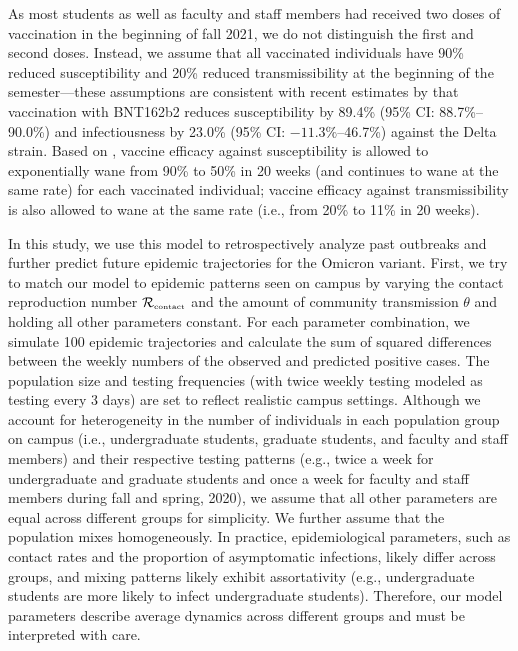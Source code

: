 \documentclass[12pt]{article}
\newcommand{\Rx}[1]{\ensuremath{{\mathcal R}_{#1}}}
\newcommand{\Rc}{\Rx{\textrm{\tiny{contact}}}}
\begin{document}
As most students as well as faculty and staff members had received two doses of vaccination in the beginning of fall 2021, we do not distinguish the first and second doses.
Instead, we assume that all vaccinated individuals have 90\% reduced susceptibility and 20\% reduced transmissibility at the beginning of the semester---these assumptions are consistent with recent estimates by \citep{prunas2022vaccination} that vaccination with BNT162b2 reduces susceptibility by 89.4\% (95\% CI: 88.7\%--90.0\%) and infectiousness by 23.0\% (95\% CI: $-11.3\%$--46.7\%) against the Delta strain.
Based on \citep{tartof2021effectiveness}, vaccine efficacy against susceptibility is allowed to exponentially wane from 90\% to 50\% in 20 weeks (and continues to wane at the same rate) for each vaccinated individual;
vaccine efficacy against transmissibility is also allowed to wane at the same rate (i.e., from 20\% to 11\% in 20 weeks).

In this study, we use this model to retrospectively analyze past outbreaks and further predict future epidemic trajectories for the Omicron variant.
First, we try to match our model to epidemic patterns seen on campus by varying the contact reproduction number $\Rc$ and the amount of community transmission $\theta$ and holding all other parameters constant.
For each parameter combination, we simulate 100 epidemic trajectories and calculate the sum of squared differences between the weekly numbers of the observed and predicted positive cases.
The population size and testing frequencies (with twice weekly testing modeled as testing every 3 days) are set to reflect realistic campus settings.
Although we account for heterogeneity in the number of individuals in each population group on campus (i.e., undergraduate students, graduate students, and faculty and staff members) and their respective testing patterns (e.g., twice a week for undergraduate and graduate students and once a week for faculty and staff members during fall and spring, 2020), we assume that all other parameters are equal across different groups for simplicity. 
We further assume that the population mixes homogeneously.
In practice, epidemiological parameters, such as contact rates and the proportion of asymptomatic infections, likely differ across groups, and mixing patterns likely exhibit assortativity (e.g., undergraduate students are more likely to infect undergraduate students).
Therefore, our model parameters describe average dynamics across different groups and must be interpreted with care.
\end{document}
